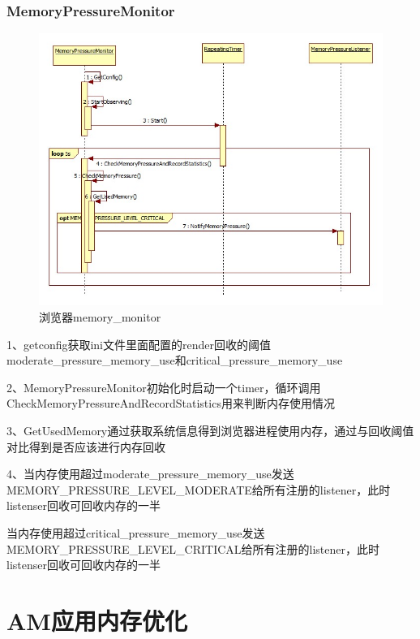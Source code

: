 \subsubsection{MemoryPressureMonitor}
\begin{figure}[H]
  \centering
  \includegraphics[width=\textwidth]{image/tbrw2_app_optimization/tbrw_memory_listener.jpg}
  \caption{浏览器memory\_monitor}
\end{figure}
1、getconfig获取ini文件里面配置的render回收的阈值moderate\_pressure\_memory\_use和critical\_pressure\_memory\_use\par
2、MemoryPressureMonitor初始化时启动一个timer，循环调用CheckMemoryPressureAndRecordStatistics用来判断内存使用情况\par
3、GetUsedMemory通过获取系统信息得到浏览器进程使用内存，通过与回收阈值对比得到是否应该进行内存回收\par
4、当内存使用超过moderate\_pressure\_memory\_use发送MEMORY\_PRESSURE\_LEVEL\_MODERATE给所有注册的listener，此时listenser回收可回收内存的一半\par
当内存使用超过critical\_pressure\_memory\_use发送MEMORY\_PRESSURE\_LEVEL\_CRITICAL给所有注册的listener，此时listenser回收可回收内存的一半


\section{AM应用内存优化}
